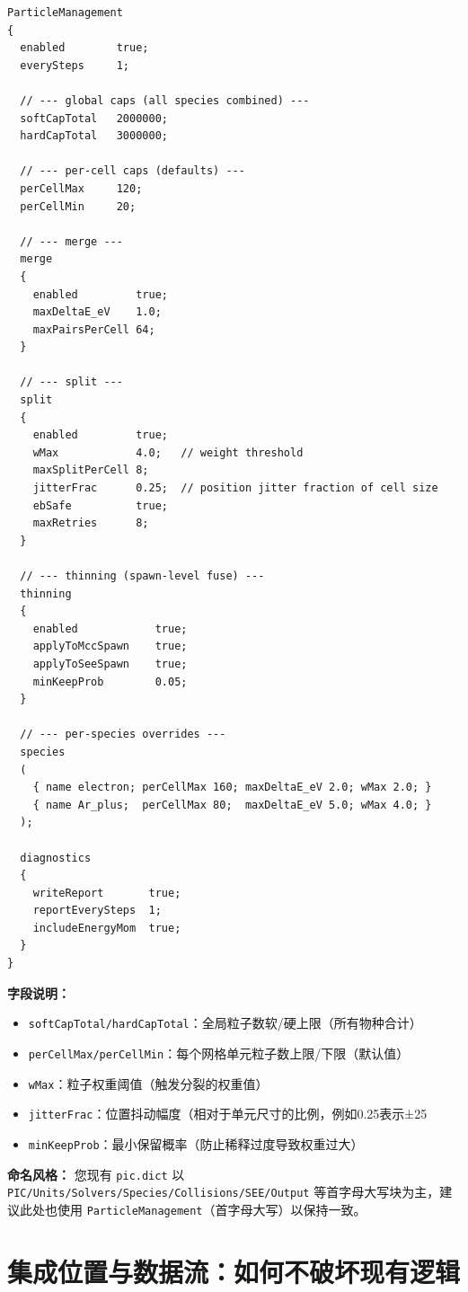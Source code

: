 \documentclass[UTF8,11pt,a4paper]{ctexart}
\begin{document}
\begin{verbatim}
ParticleManagement
{
  enabled        true;
  everySteps     1;

  // --- global caps (all species combined) ---
  softCapTotal   2000000;
  hardCapTotal   3000000;

  // --- per-cell caps (defaults) ---
  perCellMax     120;
  perCellMin     20;

  // --- merge ---
  merge
  {
    enabled         true;
    maxDeltaE_eV    1.0;
    maxPairsPerCell 64;
  }

  // --- split ---
  split
  {
    enabled         true;
    wMax            4.0;   // weight threshold
    maxSplitPerCell 8;
    jitterFrac      0.25;  // position jitter fraction of cell size
    ebSafe          true;
    maxRetries      8;
  }

  // --- thinning (spawn-level fuse) ---
  thinning
  {
    enabled            true;
    applyToMccSpawn    true;
    applyToSeeSpawn    true;
    minKeepProb        0.05;
  }

  // --- per-species overrides ---
  species
  (
    { name electron; perCellMax 160; maxDeltaE_eV 2.0; wMax 2.0; }
    { name Ar_plus;  perCellMax 80;  maxDeltaE_eV 5.0; wMax 4.0; }
  );

  diagnostics
  {
    writeReport       true;
    reportEverySteps  1;
    includeEnergyMom  true;
  }
}
\end{verbatim}

\textbf{字段说明：}
\begin{itemize}[itemsep=2pt]
  \item \texttt{softCapTotal/hardCapTotal}：全局粒子数软/硬上限（所有物种合计）
  \item \texttt{perCellMax/perCellMin}：每个网格单元粒子数上限/下限（默认值）
  \item \texttt{wMax}：粒子权重阈值（触发分裂的权重值）
  \item \texttt{jitterFrac}：位置抖动幅度（相对于单元尺寸的比例，例如0.25表示±25%
  \item \texttt{minKeepProb}：最小保留概率（防止稀释过度导致权重过大）
\end{itemize}

\textbf{命名风格：} 您现有 \texttt{pic.dict} 以 \texttt{PIC/Units/Solvers/Species/Collisions/SEE/Output} 等首字母大写块为主，建议此处也使用 \texttt{ParticleManagement}（首字母大写）以保持一致。
\section{集成位置与数据流：如何不破坏现有逻辑}
\end{document}
